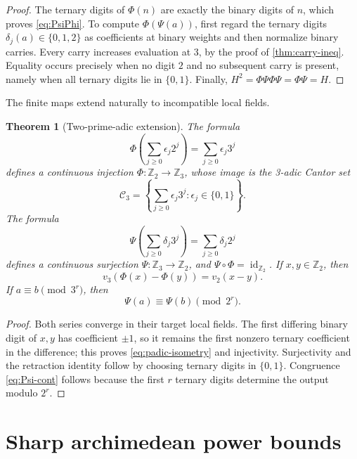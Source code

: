 \documentclass[11pt]{article}
\newtheorem{theorem}{Theorem}[section]
\theoremstyle{definition}
\newcommand{\Z}{\mathbb Z}
\begin{document}
\begin{proof}
The ternary digits of \(\Phi(n)\) are exactly the binary digits of \(n\),
which proves \cref{eq:PsiPhi}.  To compute \(\Phi(\Psi(a))\), first regard
the ternary digits \(\delta_j(a)\in\{0,1,2\}\) as coefficients at binary
weights and then normalize binary carries.  Every carry increases evaluation
at \(3\), by the proof of \cref{thm:carry-ineq}.  Equality occurs precisely
when no digit \(2\) and no subsequent carry is present, namely when all
ternary digits lie in \(\{0,1\}\).  Finally,
\(H^2=\Phi\Psi\Phi\Psi=\Phi\Psi=H\).
\end{proof}

The finite maps extend naturally to incompatible local fields.

\begin{theorem}[Two-prime-adic extension]\label{thm:padic-extension}
The formula
\[
 \Phi\!\left(\sum_{j\ge0}\epsilon_j2^j\right)
   =\sum_{j\ge0}\epsilon_j3^j
\]
defines a continuous injection \(\Phi:\Z_2\to\Z_3\), whose image is the
3-adic Cantor set
\[
 \mathcal C_3=\left\{\sum_{j\ge0}\epsilon_j3^j:
          \epsilon_j\in\{0,1\}\right\}.
\]
The formula
\[
 \Psi\!\left(\sum_{j\ge0}\delta_j3^j\right)
   =\sum_{j\ge0}\delta_j2^j
\]
defines a continuous surjection \(\Psi:\Z_3\to\Z_2\), and
\(\Psi\circ\Phi=\operatorname{id}_{\Z_2}\).  If \(x,y\in\Z_2\), then
\begin{equation}\label{eq:padic-isometry}
  v_3(\Phi(x)-\Phi(y))=v_2(x-y).
\end{equation}
If \(a\equiv b\pmod{3^r}\), then
\begin{equation}\label{eq:Psi-cont}
  \Psi(a)\equiv\Psi(b)\pmod{2^r}.
\end{equation}
\end{theorem}

\begin{proof}
Both series converge in their target local fields.  The first differing
binary digit of \(x,y\) has coefficient \(\pm1\), so it remains the first
nonzero ternary coefficient in the difference; this proves
\cref{eq:padic-isometry} and injectivity.  Surjectivity and the retraction
identity follow by choosing ternary digits in \(\{0,1\}\).  Congruence
\cref{eq:Psi-cont} follows because the first \(r\) ternary digits determine
the output modulo \(2^r\).
\end{proof}

\section{Sharp archimedean power bounds}
\label{sec:power-bounds}
\end{document}
